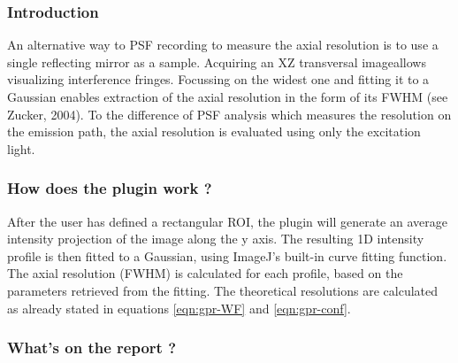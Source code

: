 \documentclass[]{spie}
\begin{document}
\subsubsection*{Introduction}
\label{subsubsec:gaar-intro}

An alternative way to PSF recording to measure the axial resolution is to use a single reflecting mirror as a sample. Acquiring an XZ transversal imageallows visualizing interference fringes. Focussing on the widest one and fitting it to a Gaussian enables extraction of the axial resolution in the form of its FWHM (see Zucker, 2004\cite{Zucker2004}). To the difference of PSF analysis which measures the resolution on the emission path, the axial resolution is evaluated using only the excitation light.

\subsubsection*{How does the plugin work ?}
\label{subsubsec:gaar-report}

After the user has defined a rectangular ROI, the plugin will generate an average intensity projection of the image along the y axis. The resulting 1D intensity profile is then fitted to a Gaussian, using ImageJ's built-in curve fitting function. The axial resolution (FWHM) is calculated for each profile, based on the parameters retrieved from the fitting. The theoretical resolutions are calculated as already stated in equations \ref{eqn:gpr-WF} and \ref{eqn:gpr-conf}.

\subsubsection*{What's on the report ?}
\label{subsubsec:gaar-report}
\end{document}
